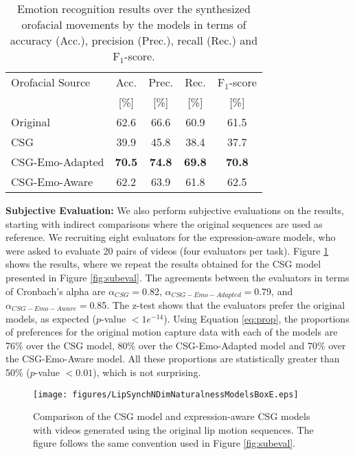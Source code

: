 \documentclass[10pt,journal,compsoc]{IEEEtran}
\begin{document}
\begin{table}
	\centering
	\caption{Emotion recognition results over the synthesized orofacial movements by the models in terms of accuracy (Acc.), precision (Prec.), recall (Rec.) and F$_1$-score.}
	\begin{tabular}{l |c c c c}
		\hline
		\multirow{1}{*}{Orofacial Source} 		&Acc. & Prec. & Rec. & F$_1$-score\\
		&[\%]&[\%]&[\%]&[\%]\\
		\hline\hline
		Original &62.6&66.6&60.9&61.5 \\
		\hline
		CSG 	 &39.9&45.8&38.4&37.7\\
		CSG-Emo-Adapted&\textbf{70.5}&\textbf{74.8}&\textbf{69.8}&\textbf{70.8}\\
		CSG-Emo-Aware&62.2&63.9&61.8&62.5 \\
		
		\hline
	\end{tabular}
	\label{tab:emo_acc}
\end{table}

\noindent
\textbf{Subjective Evaluation:}
We also perform subjective evaluations on the results, starting with indirect comparisons where the original sequences are used as reference. We recruiting eight evaluators for the expression-aware models, who were asked to evaluate 20 pairs of videos (four evaluators per task). Figure \ref{fig:subevale} shows the results, where we repeat the results obtained for the CSG model presented in Figure \ref{fig:subeval}. The agreements between the evaluators in terms of Cronbach's alpha are $\alpha_\mathit{CSG}=$0.82, $\alpha_\mathit{CSG-Emo-Adapted}=$0.79, and $\alpha_\mathit{CSG-Emo-Aware}=$0.85. The z-test shows that the evaluators prefer the original models, as expected ($p$-value $<1e^{-14}$). Using Equation \ref{eq:prop}, the proportions of preferences for the original motion capture data with each of the models are 76\% over the CSG model, 80\% over the CSG-Emo-Adapted model and 70\% over the CSG-Emo-Aware model. All these proportions are statistically greater than 50\% ($p$-value $<0.01$), which is not surprising.

\begin{figure}
	\centering
	\texttt{[image: figures/LipSynchNDimNaturalnessModelsBoxE.eps]}
	\caption{Comparison of the CSG model and expression-aware CSG models with videos generated using the original lip motion sequences. The figure follows the same convention used in Figure \ref{fig:subeval}.}
	\label{fig:subevale}
\end{figure}
\end{document}
